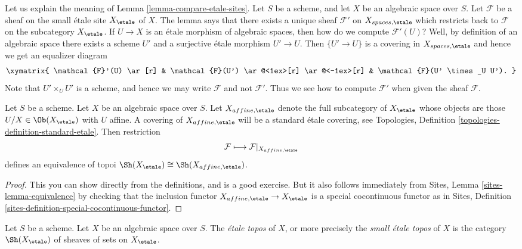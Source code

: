 \begin{remark}
\label{remark-explain-equivalence}
Let us explain the meaning of Lemma \ref{lemma-compare-etale-sites}.
Let $S$ be a scheme, and let $X$ be an algebraic space over $S$.
Let $\mathcal{F}$ be a sheaf on the small \'etale site $X_\etale$ of
$X$. The lemma says that there exists a unique sheaf $\mathcal{F}'$ on
$X_{spaces, \etale}$ which restricts back to $\mathcal{F}$ on the
subcategory $X_\etale$. If $U \to X$ is an \'etale morphism of
algebraic spaces, then how do we compute $\mathcal{F}'(U)$? Well, by definition
of an algebraic space there exists a scheme $U'$ and a surjective
\'etale morphism $U' \to U$. Then $\{U' \to U\}$ is a covering in
$X_{spaces, \etale}$ and hence we get an equalizer diagram
$$
\xymatrix{
\mathcal{F}'(U) \ar[r] &
\mathcal{F}(U') \ar@<1ex>[r] \ar@<-1ex>[r] &
\mathcal{F}(U' \times_U U').
}
$$
Note that $U' \times_U U'$ is a scheme, and hence we may
write $\mathcal{F}$ and not $\mathcal{F}'$.
Thus we see how to compute $\mathcal{F}'$
when given the sheaf $\mathcal{F}$.
\end{remark}

\begin{lemma}
\label{lemma-alternative}
Let $S$ be a scheme.
Let $X$ be an algebraic space over $S$.
Let $X_{affine, \etale}$ denote the full subcategory of
$X_\etale$ whose objects are those
$U/X \in \Ob(X_\etale)$ with $U$ affine.
A covering of $X_{affine, \etale}$ will be a
standard \'etale covering, see
Topologies, Definition \ref{topologies-definition-standard-etale}.
Then restriction
$$
\mathcal{F} \longmapsto \mathcal{F}|_{X_{affine, \etale}}
$$
defines an equivalence of topoi
$\Sh(X_\etale) \cong \Sh(X_{affine, \etale})$.
\end{lemma}

\begin{proof}
This you can show directly from the definitions, and is a good exercise.
But it also follows immediately from
Sites, Lemma \ref{sites-lemma-equivalence}
by checking that the inclusion functor
$X_{affine, \etale} \to X_\etale$ is a special cocontinuous
functor as in
Sites, Definition \ref{sites-definition-special-cocontinuous-functor}.
\end{proof}

\begin{definition}
\label{definition-etale-topos}
Let $S$ be a scheme. Let $X$ be an algebraic space over $S$.
The {\it \'etale topos} of $X$, or more precisely the
{\it small \'etale topos} of $X$ is the category
$\Sh(X_\etale)$
of sheaves of sets on $X_\etale$.
\end{definition}


